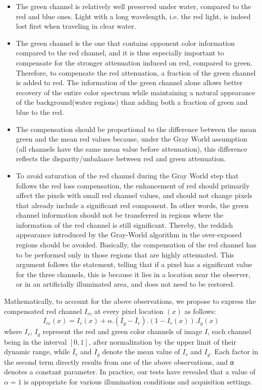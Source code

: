 \documentclass[hidelinks, 12pt]{report}
\begin{document}
\begin{itemize}
\item{The green channel is relatively well preserved under water, compared to the red and blue ones. Light with a long wavelength, i.e. the red light, is indeed lost first when traveling in clear water.}
\item{The green channel is the one that contains opponent color information compared to the red channel, and it is thus especially important to compensate for the stronger attenuation induced on red, compared to green. Therefore, to compensate the red attenuation, a fraction of the green channel is added to red. The information of the green channel alone allows better recovery of the entire color spectrum while maintaining a natural appearance of the background(water regions) than adding both a fraction of green and blue to the red.}
\item{The compensation should be proportional to the difference between the mean green and the mean red values because, under the Gray World assumption (all channels have the same mean value before attenuation), this difference reflects the disparity/unbalance between red and green attenuation.}
\item{To avoid saturation of the red channel during the Gray World step that follows the red loss compensation, the enhancement of red should primarily affect the pixels with small red channel values, and should not change pixels that already include a significant red component. In other words, the green channel information should not be transferred in regions where the information of the red channel is still significant. Thereby, the reddish appearance introduced by the Gray-World algorithm in the over-exposed regions should be avoided. Basically, the compensation of the red channel has to be performed only in those regions that are highly attenuated. This argument follows the statement, telling that if a pixel has a significant value for the three channels, this is because it lies in a location near the observer, or in an artificially illuminated area, and does not need to be restored.}
\end{itemize}
Mathematically, to account for the above observations, we propose to express the compensated red channel $I_{rc}$ at every pixel location $(x)$ as follows:
\begin{equation}
I_{rc}(x)=I_r(x)+\alpha.(\overline{I}_g-\overline{I}_r).(1-I_r(x)).I_g(x)
\end{equation}
where $I_r$, $I_g$ represent the red and green color channels of image $I$, each channel being in the interval $[0, 1]$, after normalization by the upper limit of their dynamic range, while $\overline{I}_r$ and $\overline{I}_g$ denote the mean value of $I_r$ and $I_g$. Each factor in the second term directly results from one of the above observations, and α denotes a constant parameter. In practice, our tests have revealed that a value of $\alpha=1$ is appropriate for various illumination conditions and acquisition settings.\\
\end{document}
